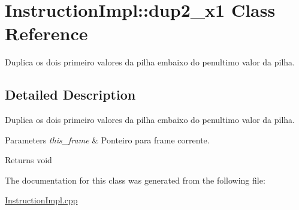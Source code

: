\hypertarget{class_instruction_impl_1_1dup2__x1}{}\section{Instruction\+Impl\+:\+:dup2\+\_\+x1 Class Reference}
\label{class_instruction_impl_1_1dup2__x1}


Duplica os dois primeiro valores da pilha embaixo do penultimo valor da pilha.  




\subsection{Detailed Description}
Duplica os dois primeiro valores da pilha embaixo do penultimo valor da pilha. 


\begin{DoxyParams}{Parameters}
{\em this\+\_\+frame} & Ponteiro para frame corrente. \\
\hline
\end{DoxyParams}
\begin{DoxyReturn}{Returns}
void 
\end{DoxyReturn}


The documentation for this class was generated from the following file\+:\begin{DoxyCompactItemize}
\item 
\hyperlink{_instruction_impl_8cpp}{Instruction\+Impl.\+cpp}\end{DoxyCompactItemize}
